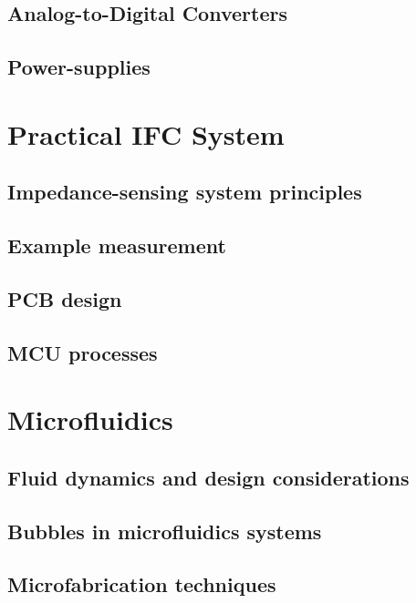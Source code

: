 \documentclass{ucetd}
\begin{document}
\section{Analog-to-Digital Converters}
\label{sec:ADC}

\section{Power-supplies}
\label{sec:Power-Supplies}


\chapter{Practical IFC System}

\section{Impedance-sensing system principles}
\label{sec:ImpedancePrinciples}

\section{Example measurement}

\section{PCB design}

\section{MCU processes}
\label{sec:MCUprocesses}


\chapter{Microfluidics}
\label{chap:Microfluidics}

\section{Fluid dynamics and design considerations}

\section{Bubbles in microfluidics systems}

\section{Microfabrication techniques}
\label{sec:FabricationMicrofluidics}

\end{document}
